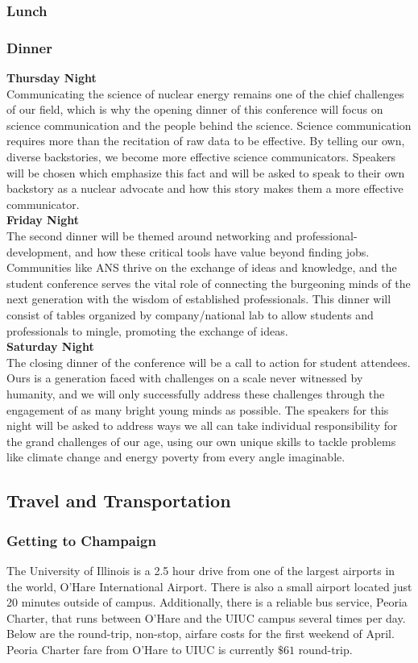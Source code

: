 \subsubsection{Lunch}
\subsubsection{Dinner}

\textbf{Thursday Night}\\
Communicating the science of nuclear energy remains one of the chief challenges of our field, which is why the opening dinner of this conference will focus on science communication and the people behind the science. Science communication requires more than the recitation of raw data to be effective. By telling our own, diverse backstories, we become more effective science communicators. Speakers will be chosen which emphasize this fact and will be asked to speak to their own backstory as a nuclear advocate and how this story makes them a more effective communicator.\\
\textbf{Friday Night}\\
The second dinner will be themed around networking and professional-development, and how these critical tools have value beyond finding jobs. Communities like ANS thrive on the exchange of ideas and knowledge, and the student conference serves the vital role of connecting the burgeoning minds of the next generation with the wisdom of established professionals. This dinner will consist of tables organized by company/national lab to allow students and professionals to mingle, promoting the exchange of ideas.\\ 
\textbf{Saturday Night}\\
The closing dinner of the conference will be a call to action for student attendees. Ours is a generation faced with challenges on a scale never witnessed by humanity, and we will only successfully address these challenges through the engagement of as many bright young minds as possible. The speakers for this night will be asked to address ways we all can take individual responsibility for the grand challenges of our age, using our own unique skills to tackle problems like climate change and energy poverty from every angle imaginable.\\ 
\subsection{Travel and Transportation}

\subsubsection{Getting to Champaign}
The University of Illinois is a 2.5 hour drive from one of the largest airports in the world, O'Hare International Airport. There is also a small airport located just 20 minutes outside of campus. Additionally, there is a reliable bus service, Peoria Charter, that runs between O'Hare and the UIUC campus several times per day. Below are the round-trip, non-stop, airfare costs for the first weekend of April. Peoria Charter fare from O'Hare to UIUC is currently $\$61$ round-trip.   

